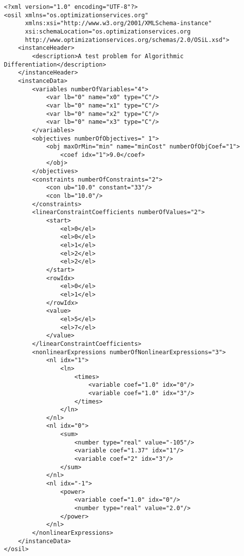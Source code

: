 \begin{verbatim}
<?xml version="1.0" encoding="UTF-8"?>
<osil xmlns="os.optimizationservices.org"
      xmlns:xsi="http://www.w3.org/2001/XMLSchema-instance"
      xsi:schemaLocation="os.optimizationservices.org
      http://www.optimizationservices.org/schemas/2.0/OSiL.xsd">
    <instanceHeader>
        <description>A test problem for Algorithmic Differentiation</description>
    </instanceHeader>
    <instanceData>
        <variables numberOfVariables="4">
            <var lb="0" name="x0" type="C"/>
            <var lb="0" name="x1" type="C"/>
            <var lb="0" name="x2" type="C"/>
            <var lb="0" name="x3" type="C"/>
        </variables>
        <objectives numberOfObjectives=" 1">
            <obj maxOrMin="min" name="minCost" numberOfObjCoef="1">
                <coef idx="1">9.0</coef>
            </obj>
        </objectives>
        <constraints numberOfConstraints="2">
            <con ub="10.0" constant="33"/>
            <con lb="10.0"/>
        </constraints>
        <linearConstraintCoefficients numberOfValues="2">
            <start>
                <el>0</el>
                <el>0</el>
                <el>1</el>
                <el>2</el>
                <el>2</el>
            </start>
            <rowIdx>
                <el>0</el>
                <el>1</el>
            </rowIdx>
            <value>
                <el>5</el>
                <el>7</el>
            </value>
        </linearConstraintCoefficients>
        <nonlinearExpressions numberOfNonlinearExpressions="3">
            <nl idx="1">
                <ln>
                    <times>
                        <variable coef="1.0" idx="0"/>
                        <variable coef="1.0" idx="3"/>
                    </times>
                </ln>
            </nl>
            <nl idx="0">
                <sum>
                    <number type="real" value="-105"/>
                    <variable coef="1.37" idx="1"/>
                    <variable coef="2" idx="3"/>
                </sum>
            </nl>
            <nl idx="-1">
                <power>
                    <variable coef="1.0" idx="0"/>
                    <number type="real" value="2.0"/>
                </power>
            </nl>
        </nonlinearExpressions>
    </instanceData>
</osil>
\end{verbatim}
\fi
{}


